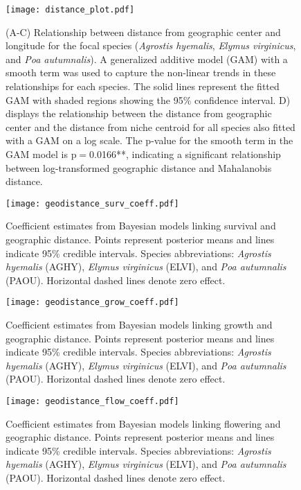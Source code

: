 \documentclass[12pt]{article}\usepackage[]{graphicx}\usepackage[dvipsnames]{xcolor}
\begin{document}
\begin{figure}[H]
\centering
\texttt{[image: distance\_plot.pdf]}
\caption{
(A-C) Relationship between distance from geographic center and longitude for the focal species (\textit{Agrostis hyemalis}, \textit{Elymus virginicus}, and \textit{Poa autumnalis}). 
A generalized additive model (GAM) with a smooth term was used to capture the non-linear trends in these relationships for each species.
The solid lines represent the fitted GAM with shaded regions showing the 95\% confidence interval.
D) displays the relationship between the distance from geographic center and the distance from niche centroid for all species also fitted with a GAM on a log scale. 
The p-value for the smooth term in the GAM model is p$=$0.0166**, indicating a significant relationship between log-transformed geographic distance and Mahalanobis distance.
}
\label{sup:md}
\end{figure}

\begin{figure}[H]
		\centering
		\texttt{[image: geodistance\_surv\_coeff.pdf]}
		\caption{Coefficient estimates from Bayesian models linking survival and geographic distance.
		 Points represent posterior means and lines indicate 95\% credible intervals.
		 Species abbreviations: \textit{Agrostis hyemalis} (AGHY), \textit{Elymus virginicus} (ELVI), and \textit{Poa autumnalis} (PAOU).
		 Horizontal dashed lines denote zero effect.}
		\label{Sup:temp_variation}
\end{figure}

\begin{figure}[H]
		\centering
		\texttt{[image: geodistance\_grow\_coeff.pdf]}
		\caption{Coefficient estimates from Bayesian models linking growth and geographic distance.
		 Points represent posterior means and lines indicate 95\% credible intervals.
		 Species abbreviations: \textit{Agrostis hyemalis} (AGHY), \textit{Elymus virginicus} (ELVI), and \textit{Poa autumnalis} (PAOU).
		 Horizontal dashed lines denote zero effect.}
		\label{Sup:temp_variation}
\end{figure}

\begin{figure}[H]
		\centering
		\texttt{[image: geodistance\_flow\_coeff.pdf]}
		\caption{Coefficient estimates from Bayesian models linking flowering and geographic distance.
		 Points represent posterior means and lines indicate 95\% credible intervals.
		 Species abbreviations: \textit{Agrostis hyemalis} (AGHY), \textit{Elymus virginicus} (ELVI), and \textit{Poa autumnalis} (PAOU).
		 Horizontal dashed lines denote zero effect.}
		\label{Sup:temp_variation}
\end{figure}
\end{document}
